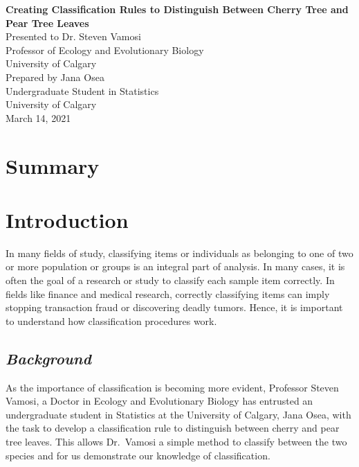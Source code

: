 \documentclass[]{article}
\author{}
\date{\vspace{-2.5em}}
\begin{document}
\fontsize{11}{15} \selectfont

\begin{titlepage}
  \vspace*{\fill}
  \begin{center}
    \LARGE{\textbf{Creating Classification Rules to Distinguish Between Cherry Tree and Pear Tree Leaves}}\\[3.5 cm]
    \large{Presented to Dr. Steven Vamosi}\\[0.5cm]
    \large{Professor of Ecology and Evolutionary Biology} \\[0.5cm]
    \large{University of Calgary} \\[3.5cm]
    \large{Prepared by Jana Osea} \\[0.5cm]
    \large{Undergraduate Student in Statistics}\\[0.5cm]
    \large{University of Calgary}\\[3.5cm]
    \large{March 14, 2021}
  \end{center}
  \vspace*{\fill}
\end{titlepage}

\tableofcontents

\newpage

\section{{Summary}}

\newpage

\section{{Introduction}}

In many fields of study, classifying items or individuals as belonging
to one of two or more population or groups is an integral part of
analysis. In many cases, it is often the goal of a research or study to
classify each sample item correctly. In fields like finance and medical
research, correctly classifying items can imply stopping transaction
fraud or discovering deadly tumors. Hence, it is important to understand
how classification procedures work.

\subsection{\normalsize{\textit{Background}}}

As the importance of classification is becoming more evident, Professor
Steven Vamosi, a Doctor in Ecology and Evolutionary Biology has
entrusted an undergraduate student in Statistics at the University of
Calgary, Jana Osea, with the task to develop a classification rule to
distinguish between cherry and pear tree leaves. This allows Dr.~Vamosi
a simple method to classify between the two species and for us
demonstrate our knowledge of classification.
\end{document}

